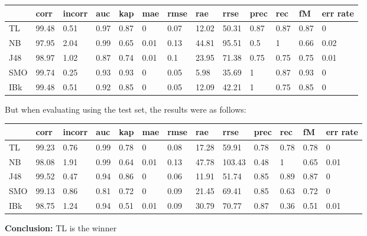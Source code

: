 \documentclass[a4paper,12pt, english]{article}
\begin{document}
\begin{small}
\begin{center}
    \begin{tabular}{ | l | l | l | l | l | l | l | l | l | l | l | l | l |}
    \hline
      	& corr & incorr  & auc & kap & mae & rmse & rae & rrse & prec & rec & fM & err rate\\ \hline
      	TL & 99.48 & 0.51 & 0.97 & 0.87 & 0 & 0.07 & 12.02 & 50.31 & 0.87 & 0.87 & 0.87 & 0\\ \hline
	NB & 97.95 & 2.04 & 0.99 & 0.65 & 0.01 & 0.13 & 44.81 & 95.51 & 0.5 & 1 & 0.66 & 0.02\\ \hline
	J48 & 98.97 & 1.02 & 0.87 & 0.74 & 0.01 & 0.1 & 23.95 & 71.38 & 0.75 & 0.75 & 0.75 & 0.01\\ \hline
	SMO & 99.74 & 0.25 & 0.93 & 0.93 & 0 & 0.05 & 5.98 & 35.69 & 1 & 0.87 & 0.93 & 0\\ \hline
	IBk & 99.48 & 0.51 & 0.92 & 0.85 & 0 & 0.05 & 12.09 & 42.21 & 1 & 0.75 & 0.85 & 0\\ \hline  
    \end{tabular}       
\end{center}
\end{small}

But when evaluating using the test set, the results were as follows:
\begin{small}
\begin{center}
    \begin{tabular}{ | l | l | l | l | l | l | l | l | l | l | l | l | l |}
    \hline
      	& corr & incorr  & auc & kap & mae & rmse & rae & rrse & prec & rec & fM & err rate\\ \hline
      	TL & 99.23 & 0.76 & 0.99 & 0.78 & 0 & 0.08 & 17.28 & 59.91 & 0.78 & 0.78 & 0.78 & 0\\ \hline
	NB & 98.08 & 1.91 & 0.99 & 0.64 & 0.01 & 0.13 & 47.78 & 103.43 & 0.48 & 1 & 0.65 & 0.01\\ \hline
	J48 & 99.52 & 0.47 & 0.94 & 0.86 & 0 & 0.06 & 11.91 & 51.74 & 0.85 & 0.89 & 0.87 & 0\\ \hline
	SMO & 99.13 & 0.86 & 0.81 & 0.72 & 0 & 0.09 & 21.45 & 69.41 & 0.85 & 0.63 & 0.72 & 0\\ \hline
	IBk & 98.75 & 1.24 & 0.94 & 0.51 & 0.01 & 0.09 & 30.79 & 70.77 & 0.87 & 0.36 & 0.51 & 0.01\\ \hline  
    \end{tabular}       
\end{center}
\end{small}
\textbf{Conclusion:} TL is the winner
\end{document}
